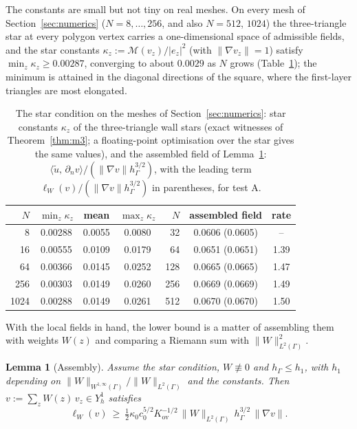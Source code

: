 \documentclass[pdflatex,sn-mathphys-num]{sn-jnl}
\theoremstyle{thmstyleone}
\newtheorem{lemma}[theorem]{Lemma}
\theoremstyle{thmstylethree}
\newcommand{\hG}{h_\Gamma}
\newcommand{\Yh}{Y_h}
\newcommand{\dn}{\partial_n}
\newcommand{\ut}{\tilde u}
\newcommand{\ip}[2]{\langle #1,\, #2\rangle}
\newcommand{\norm}[1]{\lVert #1\rVert}
\begin{document}
The constants are small but not tiny on real meshes. On every mesh of Section~\ref{sec:numerics} ($N=8,\dots,256$, and also $N=512$, $1024$) the three-triangle star at every polygon vertex carries a one-dimensional space of admissible fields, and the star constants $\kappa_z:=\mathcal M(v_z)/|e_z|^2$ (with $\norm{\nabla v_z}=1$) satisfy $\min_z\kappa_z\ge0.00287$, converging to about $0.0029$ as $N$ grows (Table~\ref{tab:stars}); the minimum is attained in the diagonal directions of the square, where the first-layer triangles are most elongated.

\begin{table}[t]
\centering\small
\caption{The star condition on the meshes of Section~\ref{sec:numerics}: star constants $\kappa_z$ of the three-triangle wall stars (exact witnesses of Theorem~\ref{thm:m3}; a floating-point optimisation over the star gives the same values), and the assembled field of Lemma~\ref{lem:assemble}: $\ip{\ut}{\dn v}/(\norm{\nabla v}\hG^{3/2})$, with the leading term $\ell_W(v)/(\norm{\nabla v}\hG^{3/2})$ in parentheses, for test A.}\label{tab:stars}
\begin{tabular}{rccc|rcc}
\toprule
$N$ & $\min_z\kappa_z$ & mean & $\max_z\kappa_z$ & $N$ & assembled field & rate\\
\midrule
8 & 0.00288 & 0.0055 & 0.0080 & 32 & 0.0606 (0.0605) & --\\
16 & 0.00555 & 0.0109 & 0.0179 & 64 & 0.0651 (0.0651) & 1.39\\
64 & 0.00366 & 0.0145 & 0.0252 & 128 & 0.0665 (0.0665) & 1.47\\
256 & 0.00303 & 0.0149 & 0.0260 & 256 & 0.0669 (0.0669) & 1.49\\
1024 & 0.00288 & 0.0149 & 0.0261 & 512 & 0.0670 (0.0670) & 1.50\\
\bottomrule
\end{tabular}
\end{table}

With the local fields in hand, the lower bound is a matter of assembling them with weights $W(z)$ and comparing a Riemann sum with $\norm{W}^2_{L^2(\Gamma)}$.

\begin{lemma}[Assembly]\label{lem:assemble}
Assume the star condition, $W\not\equiv0$ and $\hG\le h_1$, with $h_1$ depending on $\norm{W}_{W^{1,\infty}(\Gamma)}/\norm{W}_{L^2(\Gamma)}$ and the constants. Then $v:=\sum_zW(z)\,v_z\in\Yh^1$ satisfies
\[
\ell_W(v)\ \ge\ \tfrac12\kappa_0c_0^{5/2}K_{\mathrm{ov}}^{-1/2}\,\norm{W}_{L^2(\Gamma)}\,\hG^{3/2}\,\norm{\nabla v}.
\]
\end{lemma}
\end{document}
